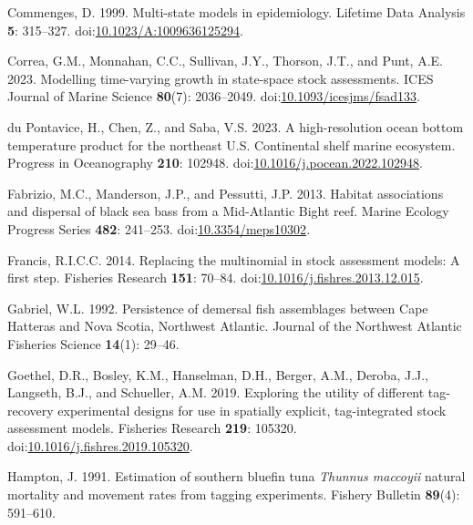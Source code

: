 \documentclass[
]{article}
\newlength{\cslhangindent}
\newlength{\cslentryspacingunit} %
\newenvironment{CSLReferences}[2] %
 {%
  \setlength{\parindent}{0pt}
  \ifodd #1
  \let\oldpar\par
  \def\par{\hangindent=\cslhangindent\oldpar}
  \fi
  \setlength{\parskip}{#2\cslentryspacingunit}
 }%
 {}
\begin{document}
\begin{CSLReferences}{1}{0}
\leavevmode{}%
Commenges, D. 1999. Multi-state models in epidemiology. Lifetime Data Analysis \textbf{5}: 315--327. doi:\href{https://doi.org/10.1023/A:1009636125294}{10.1023/A:1009636125294}.

\leavevmode{}%
Correa, G.M., Monnahan, C.C., Sullivan, J.Y., Thorson, J.T., and Punt, A.E. 2023. Modelling time-varying growth in state-space stock assessments. ICES Journal of Marine Science \textbf{80}(7): 2036--2049. doi:\href{https://doi.org/10.1093/icesjms/fsad133}{10.1093/icesjms/fsad133}.

\leavevmode{}%
du Pontavice, H., Chen, Z., and Saba, V.S. 2023. A high-resolution ocean bottom temperature product for the northeast {U}.{S}. Continental shelf marine ecosystem. Progress in Oceanography \textbf{210}: 102948. doi:\href{https://doi.org/10.1016/j.pocean.2022.102948}{10.1016/j.pocean.2022.102948}.

\leavevmode{}%
Fabrizio, M.C., Manderson, J.P., and Pessutti, J.P. 2013. Habitat associations and dispersal of black sea bass from a {M}id-{A}tlantic {B}ight reef. Marine Ecology Progress Series \textbf{482}: 241--253. doi:\href{https://doi.org/10.3354/meps10302}{10.3354/meps10302}.

\leavevmode{}%
Francis, R.I.C.C. 2014. Replacing the multinomial in stock assessment models: A first step. Fisheries Research \textbf{151}: 70--84. doi:\href{https://doi.org/10.1016/j.fishres.2013.12.015}{10.1016/j.fishres.2013.12.015}.

\leavevmode{}%
Gabriel, W.L. 1992. Persistence of demersal fish assemblages between {C}ape {H}atteras and {N}ova {S}cotia, {N}orthwest {A}tlantic. Journal of the Northwest Atlantic Fisheries Science \textbf{14}(1): 29--46.

\leavevmode{}%
Goethel, D.R., Bosley, K.M., Hanselman, D.H., Berger, A.M., Deroba, J.J., Langseth, B.J., and Schueller, A.M. 2019. Exploring the utility of different tag-recovery experimental designs for use in spatially explicit, tag-integrated stock assessment models. Fisheries Research \textbf{219}: 105320. doi:\href{https://doi.org/10.1016/j.fishres.2019.105320}{10.1016/j.fishres.2019.105320}.

\leavevmode{}%
Hampton, J. 1991. Estimation of southern bluefin tuna \emph{{T}hunnus maccoyii} natural mortality and movement rates from tagging experiments. Fishery Bulletin \textbf{89}(4): 591--610.


\end{CSLReferences}
\end{document}
